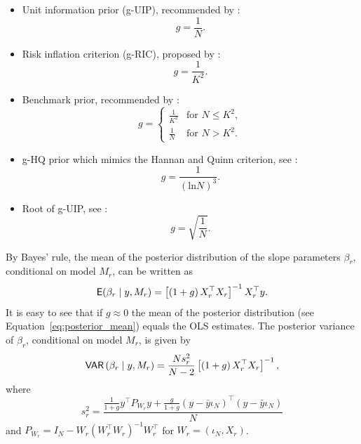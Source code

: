 \begin{itemize}\label{text:g-priors}
	\item Unit information prior (g-UIP), recommended by \cite{KassWasserman1995}:
	\begin{equation}
		g = \frac{1}{N}.
		\label{eq:g-UIP}
	\end{equation}
	\item Risk inflation criterion (g-RIC), proposed by \cite{FosterGeorge1994}:
	\begin{equation}
		g = \frac{1}{K^2}.
		\label{eq:g-RIC}
	\end{equation}
	\item Benchmark prior, recommended by \cite{FernandezLeySteel2001a}:
	\begin{equation}
		g = \left\{\begin{array}{ll}
			\frac{1}{K^2} & \mbox{for $N \le K^2$},\\
			\frac{1}{N} & \mbox{for $N>K^2$}.\end{array} \right. 
		\label{eq:Benchmark_Prior}
	\end{equation}
	\item g-HQ prior which mimics the Hannan and Quinn criterion, see \cite{FernandezLeySteel2001a}:
	\begin{equation}
		g = \frac{1}{(\text{ln}N)^3}.
		\label{eq:g-HQ}
	\end{equation}
	\item Root of g-UIP, see \cite{FernandezLeySteel2001a}:
	\begin{equation}
		g = \sqrt{\frac{1}{N}}.
		\label{eq:root-g-UIP}
	\end{equation}
\end{itemize}

By Bayes' rule, the mean of the posterior distribution of the slope
parameters $\beta_r$, conditional on model $M_r$, can be written as
\begin{equation}
	\mathsf{E}(\beta_r \mid y, M_r)= \left [ \left (1+g  \right ) X^\top_rX_r \right ]^{-1}X^\top_ry.
	\label{eq:posterior_mean}
\end{equation}
It is easy to see that if $g \approx 0$ the mean of the posterior
distribution (see Equation~\ref{eq:posterior_mean}) equals the OLS
estimates. The posterior variance of $\beta_r$, conditional on model
$M_r$, is given by
\begin{equation}
	\mathsf{VAR} \left (\beta_r \mid y, M_r \right)=\frac {Ns^2_r}{N-2}\left [ \left (1+g  \right ) X^\top_rX_r \right ]^{-1},
	\label{eq:posterior_variance2}
\end{equation}
where 
\begin{equation*}
	s^2_r=\frac{\frac{1}{1+g} y^\top P_{W_r}y+\frac{g}{1+g} \left( y-\bar y\iota_N \right)^\top \left( y-\bar y\iota_N \right)}{N}
\end{equation*}
and $P_{W_r}=I_N-W_r \left ( W^\top_rW_r \right )^{-1}W^\top_r$ for $W_r=(\iota_N,X_r)$. 

